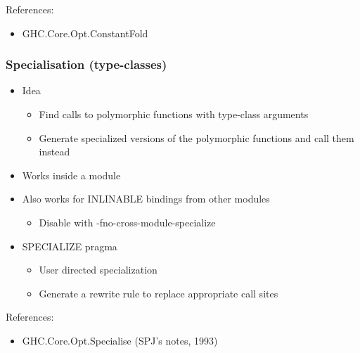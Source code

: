 \documentclass[aspectratio=169]{beamer}
\begin{document}
\begin{frame}
  References:
  \begin{itemize}
    \item GHC.Core.Opt.ConstantFold
  \end{itemize}
\end{frame}

\begin{frame}
  \frametitle{Specialisation (type-classes)}

  \begin{itemize}
    \item Idea
      \begin{itemize}
        \item Find calls to polymorphic functions with type-class arguments
        \item Generate specialized versions of the polymorphic functions and call
        them instead
      \end{itemize}
    \item Works inside a module
    \item Also works for INLINABLE bindings from other modules
      \begin{itemize}
        \item Disable with -fno-cross-module-specialize
      \end{itemize}
    \item SPECIALIZE pragma
      \begin{itemize}
        \item User directed specialization
        \item Generate a rewrite rule to replace appropriate call sites
      \end{itemize}
  \end{itemize}

  References:
  \begin{itemize}
    \item GHC.Core.Opt.Specialise (SPJ's notes, 1993)
  \end{itemize}
\end{frame}
\end{document}
